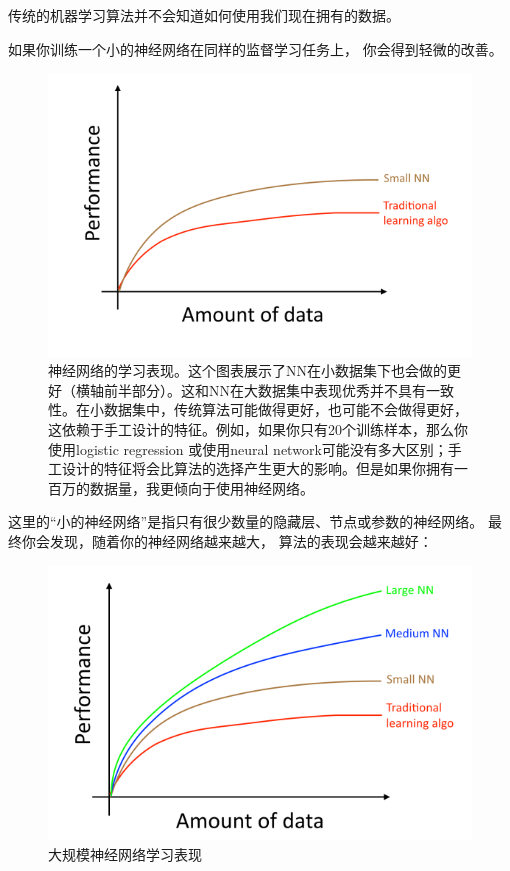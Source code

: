  传统的机器学习算法并不会知道如何使用我们现在拥有的数据。
 
 如果你训练一个小的神经网络在同样的监督学习任务上，
 你会得到轻微的改善。
 \begin{figure}[h]
 	\centering
 	\includegraphics[width=0.7\linewidth]{TeX_files/pic/4.2}
 	\caption[神经网络的学习表现]{\footnotesize 神经网络的学习表现。这个图表展示了NN在小数据集下也会做的更好（横轴前半部分）。这和NN在大数据集中表现优秀并不具有一致性。在小数据集中，传统算法可能做得更好，也可能不会做得更好，这依赖于手工设计的特征。例如，如果你只有20个训练样本，那么你使用logistic regression 或使用neural network可能没有多大区别；手工设计的特征将会比算法的选择产生更大的影响。但是如果你拥有一百万的数据量，我更倾向于使用神经网络。}
 	\label{fig:4.2}
 \end{figure}

这里的“小的神经网络”是指只有很少数量的隐藏层、节点或参数的神经网络。
最终你会发现，随着你的神经网络越来越大，
算法的表现会越来越好：

\begin{figure}[h]
	\centering
	\includegraphics[width=0.4\linewidth]{TeX_files/pic/4.3}
	\caption{大规模神经网络学习表现}
	\label{fig:4}
\end{figure}



